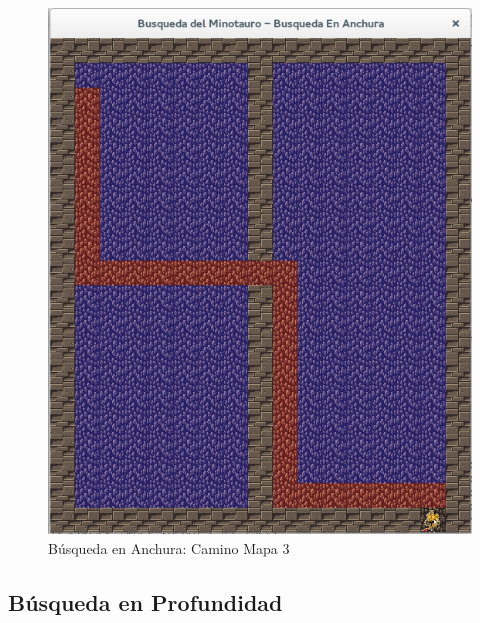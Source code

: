 \documentclass[letter, titlepage, 10pt]{article}
\begin{document}
\begin{appendices}
  \begin{figure}[H]
    \begin{center}
        \includegraphics[scale = 0.4]{images/bea_03_m3}
        \caption{Búsqueda en Anchura: Camino Mapa 3}
    \end{center}
\end{figure}

  
  \subsection{Búsqueda en Profundidad}
  

\end{appendices}
\end{document}
